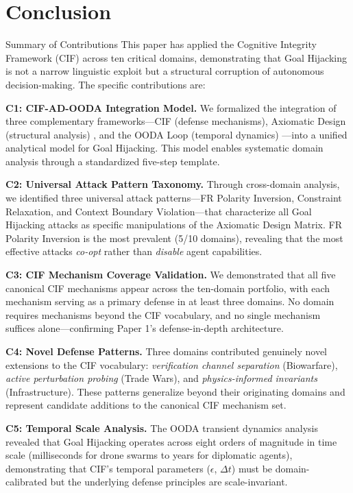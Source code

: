 \documentclass[
  ignorenonframetext,
]{beamer}
\author{\texorpdfstring{}{}}
\date{}
\begin{document}
\section{Conclusion}\label{conclusion}

\begin{frame}[allowframebreaks]{Summary of Contributions}
\protect{}\label{summary-of-contributions}
This paper has applied the Cognitive Integrity Framework (CIF)
\cite{friedman2026cogsec1} across ten critical domains, demonstrating
that Goal Hijacking is not a narrow linguistic exploit but a structural
corruption of autonomous decision-making. The specific contributions
are:

\textbf{C1: CIF-AD-OODA Integration Model.} We formalized the
integration of three complementary frameworks---CIF (defense
mechanisms), Axiomatic Design (structural analysis)
\cite{suh2001axiomatic}, and the OODA Loop (temporal dynamics)
\cite{boyd1987patterns}---into a unified analytical model for Goal
Hijacking. This model enables systematic domain analysis through a
standardized five-step template.

\textbf{C2: Universal Attack Pattern Taxonomy.} Through cross-domain
analysis, we identified three universal attack patterns---FR Polarity
Inversion, Constraint Relaxation, and Context Boundary Violation---that
characterize all Goal Hijacking attacks as specific manipulations of the
Axiomatic Design Matrix. FR Polarity Inversion is the most prevalent
(5/10 domains), revealing that the most effective attacks \emph{co-opt}
rather than \emph{disable} agent capabilities.

\textbf{C3: CIF Mechanism Coverage Validation.} We demonstrated that all
five canonical CIF mechanisms appear across the ten-domain portfolio,
with each mechanism serving as a primary defense in at least three
domains. No domain requires mechanisms beyond the CIF vocabulary, and no
single mechanism suffices alone---confirming Paper 1's defense-in-depth
architecture.

\textbf{C4: Novel Defense Patterns.} Three domains contributed genuinely
novel extensions to the CIF vocabulary: \emph{verification channel
separation} (Biowarfare), \emph{active perturbation probing} (Trade
Wars), and \emph{physics-informed invariants} (Infrastructure). These
patterns generalize beyond their originating domains and represent
candidate additions to the canonical CIF mechanism set.

\textbf{C5: Temporal Scale Analysis.} The OODA transient dynamics
analysis revealed that Goal Hijacking operates across eight orders of
magnitude in time scale (milliseconds for drone swarms to years for
diplomatic agents), demonstrating that CIF's temporal parameters
(\(\epsilon\), \(\Delta t\)) must be domain-calibrated but the
underlying defense principles are scale-invariant.


\end{frame}
\end{document}
